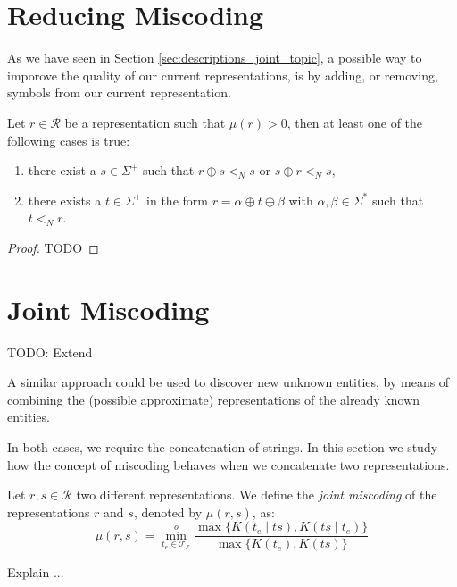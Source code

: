 %
%
\section{Reducing Miscoding}

As we have seen in Section \ref{sec:descriptions_joint_topic}, a possible way to imporove the quality of our current representations, is by adding, or removing, symbols from our current representation.

\begin{theorem}
Let $r \in \mathcal{R}$ be a representation such that $\mu(r) >0$, then at least one of the following cases is true:
\begin{enumerate}[label=(\roman*)]
\item there exist a $s \in \Sigma^{+}$ such that $r \oplus s <_N s$ or $s \oplus r <_N s$,
\item there exists a $t \in \Sigma^{+}$ in the form $r = \alpha \oplus t \oplus \beta$ with $\alpha, \beta \in \Sigma^\ast$ such that $t <_N r$.
\end{enumerate}
\end{theorem}
\begin{proof}
{\color{red} TODO}
\end{proof}


%
%
\section{Joint Miscoding}
\label{sec:joint_miscoding}


{\color{red} TODO: Extend}

A similar approach could be used to discover new unknown entities, by means of combining the (possible approximate) representations of the already known entities.

In both cases, we require the concatenation of strings. In this section we study how the concept of miscoding behaves when we concatenate two representations.

\begin{definition}
Let $r, s \in \mathcal{R}$ two different representations. We define the \emph{joint miscoding} of the representations $r$ and $s$, denoted by $\mu(r, s)$, as:
\[
\mu(r, s) =  \overset{o}{ \underset{t_e \in \mathcal{T}_\mathcal{E}} \min} \frac{ \max\{ K(t_e \mid ts), K(ts \mid t_e) \} } { \max\{ K(t_e), K(ts) \} }
\]
\end{definition}

Explain ...

